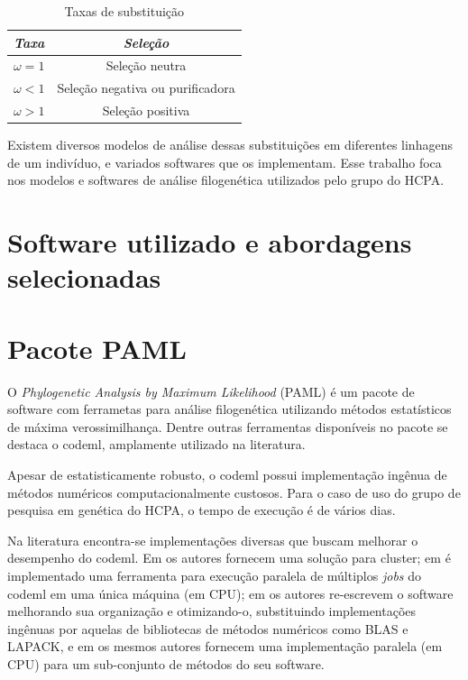 \documentclass[cic,tc]{iiufrgs}
\begin{document}
\begin{table}[h]
    \caption{Taxas de substituição}
    \centering
        \begin{tabular}{c|c}
          \hline
          \textit{Taxa}  &   \textit{Seleção} \\
          \hline
          \hline
          $\omega = 1$ & Seleção neutra \\
          $\omega < 1$ & Seleção negativa ou purificadora \\
          $\omega > 1$ & Seleção positiva \\
          \hline
        \end{tabular}
    \label{tbl:ex1}
\end{table}

Existem diversos modelos de análise dessas substituições em diferentes
linhagens de um indivíduo, e variados softwares que os implementam. Esse
trabalho foca nos modelos e softwares de análise filogenética
utilizados pelo grupo do HCPA.

\section{Software utilizado e abordagens selecionadas}

\section{Pacote PAML}

O \textit{Phylogenetic Analysis by Maximum Likelihood} (PAML) é um pacote de
software com ferrametas para análise filogenética utilizando métodos
estatísticos de máxima verossimilhança.\cite{yang2007paml} Dentre
outras ferramentas disponíveis no pacote se destaca o codeml,
amplamente utilizado na literatura.\cite{maldonado2016lmap}

Apesar de estatisticamente robusto,\cite{maldonado2016lmap} o codeml
possui implementação ingênua de métodos numéricos computacionalmente
custosos.\cite{yang2020paml} Para o caso de uso do grupo de pesquisa em
genética do HCPA, o tempo de execução é de vários dias.

Na literatura encontra-se implementações diversas que buscam melhorar o
desempenho do codeml. Em \cite{moretti2012gcodeml} os autores fornecem
uma solução para cluster; em \cite{maldonado2016lmap} é implementado uma
ferramenta para execução paralela de múltiplos \textit{jobs} do codeml
em uma única máquina (em CPU); em \cite{schabauer2012slimcodeml} os autores
re-escrevem o software melhorando sua organização e otimizando-o,
substituindo implementações ingênuas por aquelas de bibliotecas de métodos
numéricos como BLAS e LAPACK, e em \cite{valle2014optimization} os
mesmos autores fornecem uma implementação paralela (em CPU) para um
sub-conjunto de métodos do seu software.
\end{document}
